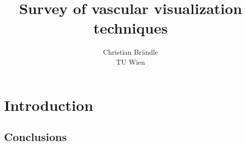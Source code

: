 \documentclass{egpubl}
\title{Survey of vascular visualization techniques}
\author{Christian Brändle
		\\
	TU Wien}
\begin{document}
\maketitle

\begin{abstract}
	
	\begin{classification} %
	\end{classification}
	
\end{abstract}

\section{Introduction}

%


\subsection{Conclusions}

%

%


\end{document}
